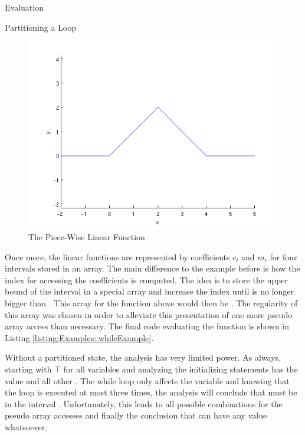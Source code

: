 \begin{chapter}{Evaluation}
\begin{section}{Partitioning a Loop}
		\begin{figure}
			\centering
			\includegraphics[scale=0.7]{Plots/whileExample.png}
			\caption{The Piece-Wise Linear Function}
			\label{figure:whileExample}
		\end{figure}

		Once more, the linear functions are represented by coefficients $c_i$ and $m_i$ for four intervals stored in an array. The main difference to the example before is how the index for accessing the coefficients is computed. The idea is to store the upper bound of the interval in a special array  and increase the index  until  is no longer bigger than . This array for the function above would then be . The regularity of this array was chosen in order to alleviate this presentation of one more pseudo array access than necessary. The final code evaluating the function is shown in Listing \ref{listing:Examples::whileExample}.

		

		Without a partitioned state, the analysis has very limited power. As always, starting with $\top$ for all variables and analyzing the initializing statements  has the value  and all other \code{[0,0]}. The while loop only affects the  variable and knowing that the loop is executed at most three times, the analysis will conclude that  must be in the interval \code{[0,3]}. Unfortunately, this leads to all possible combinations for the pseudo array accesses and finally the conclusion that  can have any value whatsoever.


\end{section}
\end{chapter}
